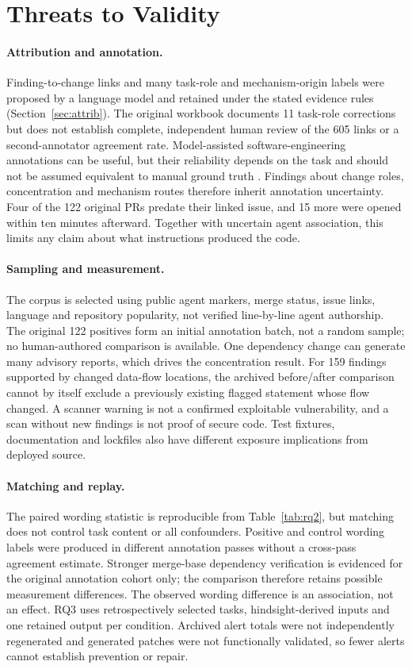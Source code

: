\documentclass[acmsmall,screen,nonacm]{acmart}
\begin{document}
\section{Threats to Validity}\label{sec:threats}

\paragraph{Attribution and annotation.} Finding-to-change links and many task-role and mechanism-origin labels were proposed by a language model and retained under the stated evidence rules (Section~\ref{sec:attrib}). The original workbook documents 11 task-role corrections but does not establish complete, independent human review of the 605 links or a second-annotator agreement rate. Model-assisted software-engineering annotations can be useful, but their reliability depends on the task and should not be assumed equivalent to manual ground truth \cite{b40}. Findings about change roles, concentration and mechanism routes therefore inherit annotation uncertainty. Four of the 122 original PRs predate their linked issue, and 15 more were opened within ten minutes afterward. Together with uncertain agent association, this limits any claim about what instructions produced the code.

\paragraph{Sampling and measurement.} The corpus is selected using public agent markers, merge status, issue links, language and repository popularity, not verified line-by-line agent authorship. The original 122 positives form an initial annotation batch, not a random sample; no human-authored comparison is available. One dependency change can generate many advisory reports, which drives the concentration result. For 159 findings supported by changed data-flow locations, the archived before/after comparison cannot by itself exclude a previously existing flagged statement whose flow changed. A scanner warning is not a confirmed exploitable vulnerability, and a scan without new findings is not proof of secure code. Test fixtures, documentation and lockfiles also have different exposure implications from deployed source.

\paragraph{Matching and replay.} The paired wording statistic is reproducible from Table~\ref{tab:rq2}, but matching does not control task content or all confounders. Positive and control wording labels were produced in different annotation passes without a cross-pass agreement estimate. Stronger merge-base dependency verification is evidenced for the original annotation cohort only; the comparison therefore retains possible measurement differences. The observed wording difference is an association, not an effect. RQ3 uses retrospectively selected tasks, hindsight-derived inputs and one retained output per condition. Archived alert totals were not independently regenerated and generated patches were not functionally validated, so fewer alerts cannot establish prevention or repair.
\end{document}
